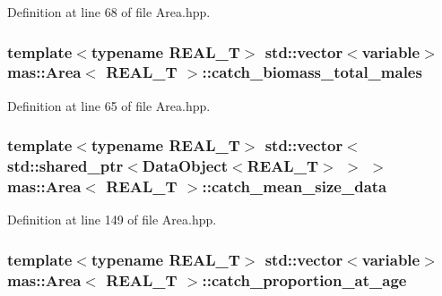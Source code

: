 Definition at line 68 of file Area.\-hpp.

\hypertarget{structmas_1_1_area_ae68e2cf3d18984ac27d377c1cfeaa0b2}{
\subsubsection[{catch\-\_\-biomass\-\_\-total\-\_\-males}]{\setlength{\rightskip}{0pt plus 5cm}template$<$typename R\-E\-A\-L\-\_\-\-T$>$ std\-::vector$<${\bf variable}$>$ {\bf mas\-::\-Area}$<$ R\-E\-A\-L\-\_\-\-T $>$\-::catch\-\_\-biomass\-\_\-total\-\_\-males}}\label{structmas_1_1_area_ae68e2cf3d18984ac27d377c1cfeaa0b2}


Definition at line 65 of file Area.\-hpp.

\hypertarget{structmas_1_1_area_af01729bc7ed50ebd5238fc2332e21501}{
\subsubsection[{catch\-\_\-mean\-\_\-size\-\_\-data}]{\setlength{\rightskip}{0pt plus 5cm}template$<$typename R\-E\-A\-L\-\_\-\-T$>$ std\-::vector$<$std\-::shared\-\_\-ptr$<${\bf Data\-Object}$<$R\-E\-A\-L\-\_\-\-T$>$ $>$ $>$ {\bf mas\-::\-Area}$<$ R\-E\-A\-L\-\_\-\-T $>$\-::catch\-\_\-mean\-\_\-size\-\_\-data}}\label{structmas_1_1_area_af01729bc7ed50ebd5238fc2332e21501}


Definition at line 149 of file Area.\-hpp.

\hypertarget{structmas_1_1_area_a896fd8fcd47d539873630d45ec818ade}{
\subsubsection[{catch\-\_\-proportion\-\_\-at\-\_\-age}]{\setlength{\rightskip}{0pt plus 5cm}template$<$typename R\-E\-A\-L\-\_\-\-T$>$ std\-::vector$<${\bf variable}$>$ {\bf mas\-::\-Area}$<$ R\-E\-A\-L\-\_\-\-T $>$\-::catch\-\_\-proportion\-\_\-at\-\_\-age}}\label{structmas_1_1_area_a896fd8fcd47d539873630d45ec818ade}


